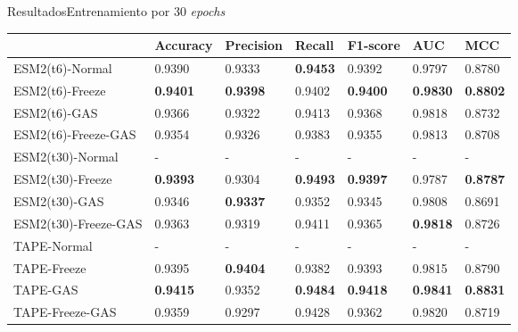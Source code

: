 \documentclass[10pt]{beamer}
\newcommand{\1}{
	\setbeamertemplate{background}{
		\texttt{[image: img/1]}
		\tikz[overlay] \fill[fill opacity=0.75,fill=white] (0,0) rectangle (-\paperwidth,\paperheight);
	}
}
\begin{document}
\begin{frame}{Resultados}{Entrenamiento por 30 \textit{epochs}}
	\begin{table}[]
		\centering
		\setlength{\tabcolsep}{0.5em} %
		{\renewcommand{\arraystretch}{1.5}%
			\scriptsize
			\begin{tabular}{lllllll} 
				\textbf{}            & \textbf{Accuracy} & \textbf{Precision} & \textbf{Recall} & \textbf{F1-score} & \textbf{AUC}    & \textbf{MCC}    \\ \hline
				ESM2(t6)-Normal             & 0.9390            & 0.9333             & \textbf{0.9453} & 0.9392            & 0.9797          & 0.8780                    \\
				ESM2(t6)-Freeze      & \textbf{0.9401}   & \textbf{0.9398}    & 0.9402          & \textbf{0.9400}   & \textbf{0.9830} & \textbf{0.8802}             \\
				ESM2(t6)-GAS         & 0.9366            & 0.9322             & 0.9413          & 0.9368            & 0.9818          & 0.8732                     \\
				ESM2(t6)-Freeze-GAS  & 0.9354            & 0.9326             & 0.9383          & 0.9355            & 0.9813          & 0.8708                    \\ \hline
				ESM2(t30)-Normal            & -                 & -                  & -               & -                 & -               & -                                 \\
				ESM2(t30)-Freeze     & \textbf{0.9393}   & 0.9304             & \textbf{0.9493} & \textbf{0.9397}   & 0.9787          & \textbf{0.8787}           \\
				ESM2(t30)-GAS        & 0.9346            & \textbf{0.9337}    & 0.9352          & 0.9345            & 0.9808          & 0.8691                    \\
				ESM2(t30)-Freeze-GAS & 0.9363            & 0.9319             & 0.9411          & 0.9365            & \textbf{0.9818} & 0.8726                    \\ \hline
				TAPE-Normal                 & -                 & -                  & -               & -                 & -               & -                                  \\
				TAPE-Freeze          & 0.9395            & \textbf{0.9404}    & 0.9382          & 0.9393            & 0.9815          & 0.8790                      \\
				TAPE-GAS             & \textbf{0.9415}   & 0.9352             & \textbf{0.9484} & \textbf{0.9418}   & \textbf{0.9841} & \textbf{0.8831}            \\
				TAPE-Freeze-GAS      & 0.9359            & 0.9297             & 0.9428          & 0.9362            & 0.9820          & 0.8719               \\     
		\end{tabular}}
	\end{table}
\end{frame}
\end{document}

